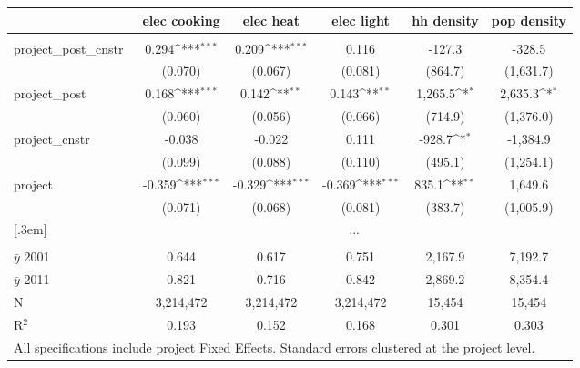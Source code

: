 {\footnotesize
{}  
\def\sym#1{\ifmmode^{#1}\else\(^{#1}\)\fi}
\begin{tabular}{l*{5}{c}}
          &\multicolumn{1}{c}{elec cooking} &\multicolumn{1}{c}{elec heat}  &\multicolumn{1}{c}{elec light}         &\multicolumn{1}{c}{hh density}         &\multicolumn{1}{c}{pop density}    
          \\[0.2em]
\hline\\[-0.9em]
\rowcolor{o} {\scriptsize project\_post\_cnstr$\,\,\,$} &  0.294\sym{***} &  0.209\sym{***} &  0.116   & -127.3  & -328.5     \\
\rowcolor{o}             &  (0.070)        &  (0.067)        &  (0.081) &(864.7)  &(1,631.7)\\
[.5em]
{\scriptsize project\_post} & 0.168\sym{***}& 0.142\sym{**} & 0.143\sym{**} &1,265.5\sym{*} &2,635.3\sym{*}  \\
              &  (0.060)       &  (0.056)      &  (0.066)      &(714.9)        &(1,376.0)       \\
[.5em]
{\scriptsize project\_cnstr} & -0.038    &   -0.022      &    0.111      & -928.7\sym{*} &-1,384.9  \\
                   & (0.099)   &  (0.088)      &  (0.110)      & (495.1)       &(1,254.1) \\
[.5em]
{\scriptsize project}     & -0.359\sym{***} & -0.329\sym{***}&-0.369\sym{***}&  835.1\sym{**}&1,649.6         \\
            &  (0.071)        &  (0.068)       &  (0.081)      &(383.7)        &(1,005.9)       \\
[.3em]
& \multicolumn{5}{c}{...}\\
[.5em]
\hline \\[-0.9em] 
$\bar{y}$ 2001& 0.644      &    0.617       &    0.751       &2,167.9      &7,192.7         \\
$\bar{y}$ 2011& 0.821      &    0.716       &    0.842       &2,869.2      &8,354.4         \\
N          &  3,214,472    &  3,214,472     &  3,214,472     & 15,454        &    15,454         \\
R$^{2}$    & 0.193         &    0.152       &    0.168       &    0.301      &    0.303         \\
\hline
\multicolumn{6}{l}{\tiny All specifications include project Fixed Effects. Standard errors clustered at the project level.}
\end{tabular}
}

